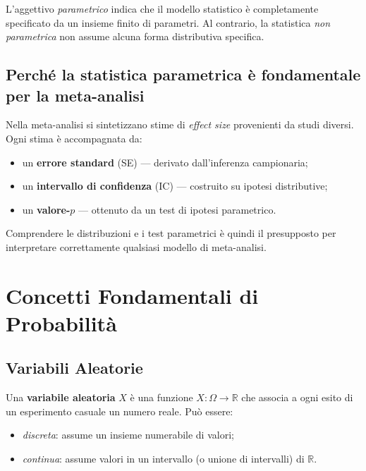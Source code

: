\documentclass[12pt, a4paper]{article}
\newcommand{\R}{\mathbb{R}}
\begin{document}
\begin{chiave}
  L'aggettivo \emph{parametrico} indica che il modello statistico è
  completamente specificato da un insieme finito di parametri.
  Al contrario, la statistica \emph{non parametrica} non assume alcuna
  forma distributiva specifica.
\end{chiave}

\subsection{Perché la statistica parametrica è fondamentale per la meta-analisi}

Nella meta-analisi si sintetizzano stime di \emph{effect size} provenienti da
studi diversi. Ogni stima è accompagnata da:
\begin{itemize}
  \item un \textbf{errore standard} (SE) — derivato dall'inferenza campionaria;
  \item un \textbf{intervallo di confidenza} (IC) — costruito su ipotesi distributive;
  \item un \textbf{valore-$p$} — ottenuto da un test di ipotesi parametrico.
\end{itemize}

Comprendere le distribuzioni e i test parametrici è quindi il presupposto
per interpretare correttamente qualsiasi modello di meta-analisi.

\section{Concetti Fondamentali di Probabilità}

\subsection{Variabili Aleatorie}

\begin{definizione}
  Una \textbf{variabile aleatoria} $X$ è una funzione
  $X : \Omega \to \R$ che associa a ogni esito di un esperimento casuale
  un numero reale. Può essere:
  \begin{itemize}
    \item \emph{discreta}: assume un insieme numerabile di valori;
    \item \emph{continua}: assume valori in un intervallo (o unione di
      intervalli) di $\R$.
  \end{itemize}
\end{definizione}
\end{document}
